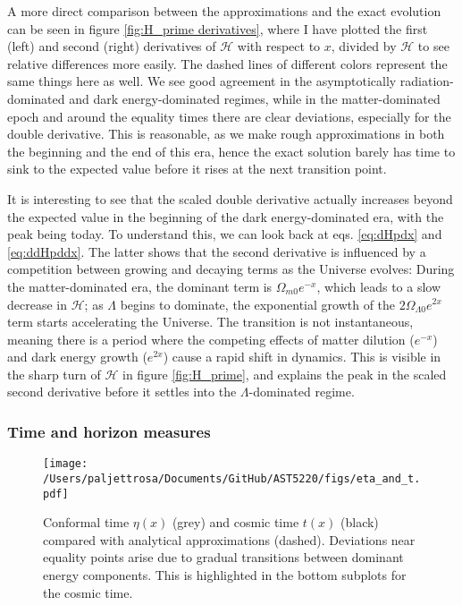 \documentclass{aa}
\numberwithin{equation}{section}
\numberwithin{table}{section}
\numberwithin{figure}{section}
\begin{document}
A more direct comparison between the approximations and the exact evolution can be seen in figure \ref{fig:H_prime derivatives}, where I have plotted the first (left) and second (right) derivatives of $\mathcal{H}$ with respect to $x$, divided by $\mathcal{H}$ to see relative differences more easily. The dashed lines of different colors represent the same things here as well. We see good agreement in the asymptotically radiation-dominated and dark energy-dominated regimes, while in the matter-dominated epoch and around the equality times there are clear deviations, especially for the double derivative. This is reasonable, as we make rough approximations in both the beginning and the end of this era, hence the exact solution barely has time to sink to the expected value before it rises at the next transition point. 

It is interesting to see that the scaled double derivative actually increases beyond the expected value in the beginning of the dark energy-dominated era, with the peak being today. To understand this, we can look back at eqs. \eqref{eq:dHpdx} and \eqref{eq:ddHpddx}. The latter shows that the second derivative is influenced by a competition between growing and decaying terms as the Universe evolves: During the matter-dominated era, the dominant term is $\Omega_{m0} e^{-x}$, which leads to a slow decrease in $\mathcal{H}$; as $\Lambda$ begins to dominate, the exponential growth of the $2\Omega_{\Lambda 0} e^{2x}$ term starts accelerating the Universe. The transition is not instantaneous, meaning there is a period where the competing effects of matter dilution ($e^{-x}$) and dark energy growth ($e^{2x}$) cause a rapid shift in dynamics. This is visible in the sharp turn of $\mathcal{H}$ in figure \ref{fig:H_prime}, and explains the peak in the scaled second derivative before it settles into the $\Lambda$-dominated regime.


\subsubsection{Time and horizon measures}
\begin{figure*}
  \centering
  \texttt{[image: /Users/paljettrosa/Documents/GitHub/AST5220/figs/eta\_and\_t.pdf]}
  \caption{Conformal time $\eta(x)$ (grey) and cosmic time $t(x)$ (black) compared with analytical approximations (dashed). Deviations near equality points arise due to gradual transitions between dominant energy components. This is highlighted in the bottom subplots for the cosmic time.}\label{fig:eta and t}
\end{figure*}
\end{document}
